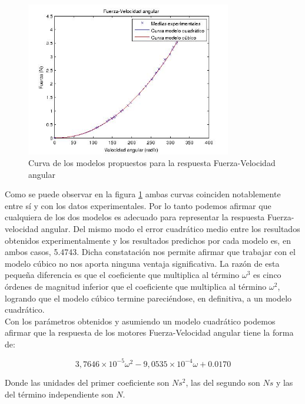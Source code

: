 \documentclass[spanish,12pt,a4paper,titlepage]{report}
\begin{document}
\begin{figure}
  \vspace{-20pt}
  \begin{center}
    \includegraphics[width=0.8\textwidth]{./Pics/modsfvel.jpg}
  \end{center}
  \vspace{-20pt}
  \caption{Curva de los modelos propuestos para la respuesta Fuerza-Velocidad angular}
  \label{fig:grafica2}
  \vspace{-10pt}
\end{figure}

Como se puede observar en la figura \ref{fig:grafica2} ambas curvas coinciden notablemente entre sí y con los datos experimentales. Por lo tanto podemos afirmar que cualquiera de los dos modelos es adecuado para representar la respuesta Fuerza-velocidad angular. Del mismo modo el error cuadrático medio entre los resultados obtenidos experimentalmente y los resultados predichos por cada modelo es, en ambos casos, 5.4743. Dicha constatación nos permite afirmar que trabajar con el modelo cúbico no nos aporta ninguna ventaja significativa. La razón de esta pequeña diferencia es que el coeficiente que multiplica al término $\omega^3$ es cinco órdenes de magnitud inferior que el coeficiente que multiplica al término $\omega^2$, logrando que el modelo cúbico termine pareciéndose, en definitiva, a un modelo cuadrático.\\

Con los parámetros obtenidos y asumiendo un modelo cuadrático podemos afirmar que la respuesta de los motores Fuerza-Velocidad angular tiene la forma de:

\begin{equation}
3,7646 \times 10^{-5}\omega ^2 - 9,0535 \times 10^{-4}\omega +0.0170
\end{equation}

Donde las unidades del primer coeficiente son $Ns^2$, las del segundo son $Ns$ y las del término independiente son $N$.
\end{document}
